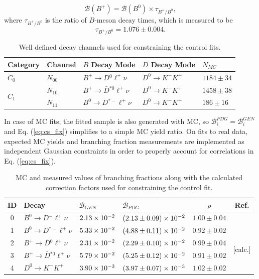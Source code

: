 \begin{equation}
\mathcal{B}(B^+) = \mathcal{B}(B^0) \times \tau_{B^+/B^0},
\end{equation}
where $\tau_{B^+/B^0}$ is the ratio of $B$-meson decay times, which is measured to be \cite{Amhis:2016xyh}
\begin{equation}
\tau_{B^+/B^0} = 1.076 \pm 0.004.
\end{equation}

\begin{table}[H]
	\centering
	\begin{tabular}{l|l|l|l|l}
		Category & Channel & $B$ Decay Mode & $D$ Decay Mode & $N_{MC}$ \\
		\toprule
		$C_0$ & $N_{00}$ & $B^+ \to \bar D {}^{0} \ell^+ \nu$ & $D^0 \to K^-K^+$ & $1184 \pm 34$\\
		\midrule
		\multirow{2}{*}{$C_1$} & $N_{10}$ & $B^+ \to \bar D {}^{*0} \ell^+ \nu$ & $D^0 \to K^-K^+$ & $1458\pm38$\\
		& $N_{11}$ & $B^0 \to D {}^{*-} \ell^+ \nu$ & $D^0 \to K^-K^+$ & $186\pm16$\\
		\bottomrule
	\end{tabular}
	\captionsetup{width=0.8\linewidth}
	\caption{Well defined decay channels used for constraining the control fits.}
	\label{tab:cs_constraint_table}
\end{table}

In case of MC fits, the fitted sample is also generated with MC, so $\mathcal{B}_{i}^{PDG} = \mathcal{B}_{i}^{GEN}$ and Eq. (\ref{eq:cs_fix}) simplifies to a simple MC yield ratio. On fits to real data, expected MC yields and branching fraction measurements are implemented as independent Gaussian constraints in order to properly account for correlations in Eq. (\ref{eq:cs_fix}).
\begin{table}[H]
	\centering
	\begin{tabular}{c|l|l|l|c|c}
		ID & Decay & $\mathcal{B}_{GEN}$ & $\mathcal{B}_{PDG}$ & $\rho$ & Ref. \\
		\toprule
		0 & $B^0 \to D {}^{-} \ell^+ \nu$ & $2.13\times 10^{-2}$ & $(2.13 \pm 0.09)\times 10^{-2}$ & $1.00 \pm 0.04$ & \multirow{2}{*}{\cite{Amhis:2016xyh}} \\ 
		1 & $B^0 \to D {}^{*-} \ell^+ \nu$ & $5.33\times 10^{-2}$ & $(4.88 \pm 0.11)\times 10^{-2}$ & $0.92 \pm 0.02$ & \\
		\cline{6-6}
		2 & $B^+ \to \bar D {}^{0} \ell^+ \nu$ & $2.31\times 10^{-2}$ & $(2.29 \pm 0.10)\times 10^{-2}$ &  $0.99 \pm 0.04$ & \multirow{2}{*}{[calc.]} \\ 
		3 & $B^+ \to \bar D {}^{*0} \ell^+ \nu$ & $5.79\times 10^{-2}$ & $(5.25 \pm 0.12)\times 10^{-2}$ &  $0.91 \pm 0.02$ & \\
		\cline{6-6}
		4 & $D^0 \to K^-K^+$ & $3.90\times 10^{-3}$ & $(3.97\pm0.07)\times 10^{-3}$ & $1.02 \pm 0.02$ & \cite{tanabashi2018review} \\
		\bottomrule
	\end{tabular}
	\captionsetup{width=0.8\linewidth}
	\caption{MC and measured values of branching fractions along with the calculated correction factors used for constraining the control fit.}
	\label{tab:cs_br_constraint_table}
\end{table}

